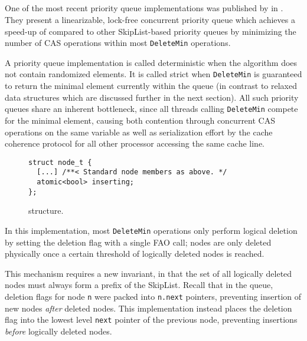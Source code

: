 \documentclass[a4paper,10pt]{article}
\begin{document}
\subsection{\citeauthor{linden2013skiplist}} \label{sec:linden}

One of the most recent priority queue implementations was published by \citeauthor{linden2013skiplist}
in \citeyear{linden2013skiplist} \cite{linden2013skiplist}. They present a linearizable, lock-free concurrent priority
queue which achieves a speed-up of  compared to other SkipList-based priority queues by
minimizing the number of \ac{CAS} operations within most \lstinline|DeleteMin| operations.

A priority queue implementation is called deterministic when the algorithm does not contain randomized elements.
It is called strict when \lstinline|DeleteMin| is guaranteed to return the minimal element currently within the queue
(in contrast to relaxed data structures which are discussed further in the next section).
All such priority queues share an inherent bottleneck, since all threads calling \lstinline|DeleteMin| compete
for the minimal element, causing both contention through concurrent \ac{CAS} operations on the same variable
as well as serialization effort by the cache coherence protocol for all other processor accessing the same cache
line.

\begin{figure}[ht]
\begin{lstlisting}
struct node_t {
  [...] /**< Standard node members as above. */
  atomic<bool> inserting;
};
\end{lstlisting}
\caption{\citeauthor{linden2013skiplist} structure.}
\label{fig:lindensl}
\end{figure}

In this implementation, most \lstinline|DeleteMin| operations only perform logical deletion by setting
the deletion flag with a single \ac{FAO} call; nodes are only deleted physically once a certain
threshold of logically deleted nodes is reached.

This mechanism requires a new invariant, in that the set of all logically deleted nodes must always
form a prefix of the SkipList. Recall that in the \citeauthor{sundell2003fast} queue, deletion flags
for node \lstinline|n| were packed into \lstinline|n.next| pointers, preventing insertion of new
nodes \emph{after} deleted nodes. This implementation instead places the deletion flag into the
lowest level \lstinline|next| pointer of the previous node, preventing insertions \emph{before}
logically deleted nodes.
\end{document}
